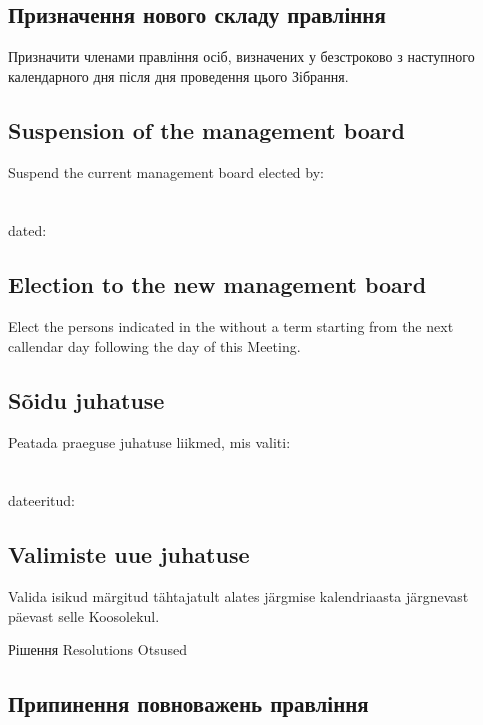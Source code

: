 \begin{Form}
\begin{paracol}{3}
{          \subsection{Призначення нового складу правління}
          Призначити членами правління осіб, визначених у  безстроково з наступного календарного дня після дня проведення цього Зібрання.
        }
        { \subsection{Suspension of the management board}
          Suspend the current management board elected by:\\
          \\
          \\
          dated:\\
          \subsection{Election to the new management board}
          Elect the persons indicated in the  without a term starting from the next callendar day following the day of this Meeting.
        }
        { \subsection{Sõidu juhatuse}
          Peatada praeguse juhatuse liikmed, mis valiti:\\
          \\
          \\
          dateeritud:\\
          \subsection{Valimiste uue juhatuse}
          Valida isikud märgitud  tähtajatult alates järgmise kalendriaasta järgnevast päevast selle Koosolekul.
        }

      \clause
        {Рішення}
        {Resolutions}
        {Otsused}
        { \subsection{Припинення повноважень правління}
}
\end{paracol}
\end{Form}
